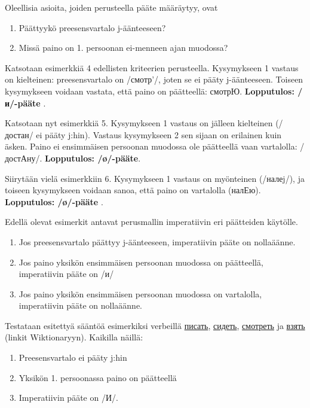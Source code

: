 \documentclass[]{scrartcl}
\providecommand{\tightlist}{%
  \setlength{\itemsep}{0pt}\setlength{\parskip}{0pt}}
\begin{document}
Oleellisia asioita, joiden perusteella pääte määräytyy, ovat

\begin{enumerate}
\def\labelenumi{\arabic{enumi}.}
\tightlist
\item
  Päättyykö preesensvartalo j-äänteeseen?
\item
  Missä paino on 1. persoonan ei-menneen ajan muodossa?
\end{enumerate}

Katsotaan esimerkkiä 4 edellisten kriteerien perusteella. Kysymykseen 1
vastaus on kielteinen: preesensvartalo on /смотр'/, joten se ei pääty
j-äänteeseen. Toiseen kysymykseen voidaan vastata, että paino on
päätteellä: смотрЮ. \textbf{Lopputulos: /и/-pääte} .

Katsotaan nyt esimerkkiä 5. Kysymykseen 1 vastaus on jälleen kielteinen
(/достан/ ei pääty j:hin). Vastaus kysymykseen 2 sen sijaan on erilainen
kuin äsken. Paino ei ensimmäisen persoonan muodossa ole päätteellä vaan
vartalolla: /достАну/. \textbf{Lopputulos: /ø/-pääte}.

Siirytään vielä esimerkkiin 6. Kysymykseen 1 vastaus on myönteinen
(/налеj/), ja toiseen kysymykseen voidaan sanoa, että paino on
vartalolla (налЕю). \textbf{Lopputulos: /ø/-pääte} .

Edellä olevat esimerkit antavat perusmallin imperatiivin eri päätteiden
käytölle.

\begin{enumerate}
\def\labelenumi{\arabic{enumi}.}
\tightlist
\item
  Jos preesensvartalo päättyy j-äänteeseen, imperatiivin pääte on
  nollaäänne.
\item
  Jos paino yksikön ensimmäisen persoonan muodossa on päätteellä,
  imperatiivin pääte on /и/
\item
  Jos paino yksikön ensimmäisen persoonan muodossa on vartalolla,
  imperatiivin pääte on nollaäänne.
\end{enumerate}

Testataan esitettyä sääntöä esimerkiksi verbeillä
\href{http://ru.wiktionary.org/wiki/писать}{писать},
\href{http://ru.wiktionary.org/wiki/сидеть}{сидеть},
\href{http://ru.wiktionary.org/wiki/смотреть}{смотреть} ja
\href{http://ru.wiktionary.org/wiki/взять}{взять} (linkit Wiktionaryyn).
Kaikilla näillä:

\begin{enumerate}
\def\labelenumi{\arabic{enumi}.}
\tightlist
\item
  Preesensvartalo ei pääty j:hin
\item
  Yksikön 1. persoonassa paino on päätteellä
\item
  Imperatiivin pääte on /И/.
\end{enumerate}
\end{document}
